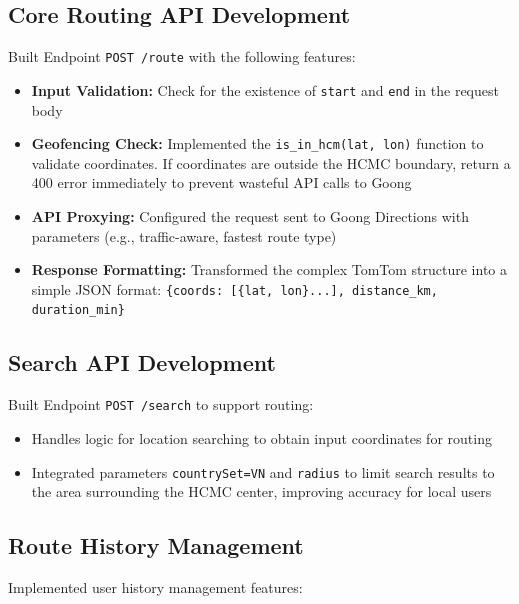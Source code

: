 \subsection{Core Routing API Development}

Built Endpoint \texttt{POST /route} with the following features:

\begin{itemize}
    \item \textbf{Input Validation:} Check for the existence of \texttt{start} and \texttt{end} in the request body
    \item \textbf{Geofencing Check:} Implemented the \texttt{is\_in\_hcm(lat, lon)} function to validate coordinates. If coordinates are outside the HCMC boundary, return a 400 error immediately to prevent wasteful API calls to Goong
    \item \textbf{API Proxying:} Configured the request sent to Goong Directions with parameters (e.g., traffic-aware, fastest route type)
    \item \textbf{Response Formatting:} Transformed the complex TomTom structure into a simple JSON format: \texttt{\{coords: [\{lat, lon\}...], distance\_km, duration\_min\}}
\end{itemize}

\subsection{Search API Development}


Built Endpoint \texttt{POST /search} to support routing:

\begin{itemize}
    \item Handles logic for location searching to obtain input coordinates for routing
    \item Integrated parameters \texttt{countrySet=VN} and \texttt{radius} to limit search results to the area surrounding the HCMC center, improving accuracy for local users
\end{itemize}

\subsection{Route History Management}

Implemented user history management features:

